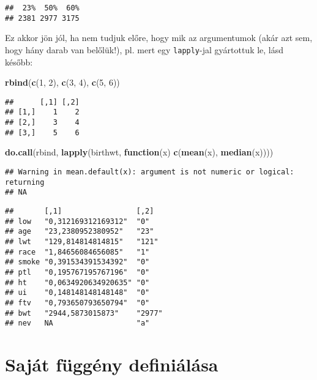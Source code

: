\documentclass[]{book}
\newenvironment{Shaded}{\begin{snugshade}}{\end{snugshade}}
\newcommand{\KeywordTok}[1]{\textcolor[rgb]{0.13,0.29,0.53}{\textbf{#1}}}
\newcommand{\DecValTok}[1]{\textcolor[rgb]{0.00,0.00,0.81}{#1}}
\newcommand{\ControlFlowTok}[1]{\textcolor[rgb]{0.13,0.29,0.53}{\textbf{#1}}}
\newcommand{\NormalTok}[1]{#1}
\begin{document}
\begin{verbatim}
##  23%  50%  60% 
## 2381 2977 3175
\end{verbatim}

Ez akkor jön jól, ha nem tudjuk előre, hogy mik az argumentumok (akár
azt sem, hogy hány darab van belőlük!), pl. mert egy \texttt{lapply}-jal
gyártottuk le, lásd később:

\begin{Shaded}
\begin{Highlighting}[]
\KeywordTok{rbind}\NormalTok{(}\KeywordTok{c}\NormalTok{(}\DecValTok{1}\NormalTok{, }\DecValTok{2}\NormalTok{), }\KeywordTok{c}\NormalTok{(}\DecValTok{3}\NormalTok{, }\DecValTok{4}\NormalTok{), }\KeywordTok{c}\NormalTok{(}\DecValTok{5}\NormalTok{, }\DecValTok{6}\NormalTok{))}
\end{Highlighting}
\end{Shaded}

\begin{verbatim}
##      [,1] [,2]
## [1,]    1    2
## [2,]    3    4
## [3,]    5    6
\end{verbatim}

\begin{Shaded}
\begin{Highlighting}[]
\KeywordTok{do.call}\NormalTok{(rbind, }\KeywordTok{lapply}\NormalTok{(birthwt, }\ControlFlowTok{function}\NormalTok{(x) }\KeywordTok{c}\NormalTok{(}\KeywordTok{mean}\NormalTok{(x), }\KeywordTok{median}\NormalTok{(x))))}
\end{Highlighting}
\end{Shaded}

\begin{verbatim}
## Warning in mean.default(x): argument is not numeric or logical: returning
## NA
\end{verbatim}

\begin{verbatim}
##       [,1]                 [,2]  
## low   "0,312169312169312"  "0"   
## age   "23,2380952380952"   "23"  
## lwt   "129,814814814815"   "121" 
## race  "1,84656084656085"   "1"   
## smoke "0,391534391534392"  "0"   
## ptl   "0,195767195767196"  "0"   
## ht    "0,0634920634920635" "0"   
## ui    "0,148148148148148"  "0"   
## ftv   "0,793650793650794"  "0"   
## bwt   "2944,5873015873"    "2977"
## nev   NA                   "a"
\end{verbatim}

\section{Saját függény definiálása}\label{sajat-fuggeny-definialasa}
\end{document}
